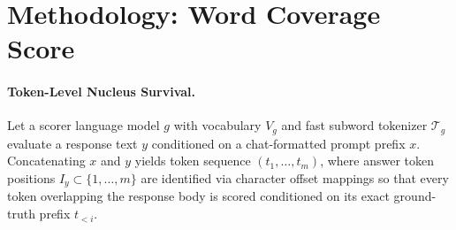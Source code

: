 \documentclass[11pt]{article}
\begin{document}
\section{Methodology: Word Coverage Score}

\paragraph{Token-Level Nucleus Survival.}
Let a scorer language model $g$ with vocabulary $V_g$ and fast subword tokenizer $\mathcal{T}_g$ evaluate a response text $y$ conditioned on a chat-formatted prompt prefix $x$. Concatenating $x$ and $y$ yields token sequence $(t_1, \dots, t_m)$, where answer token positions $I_y \subset \{1, \dots, m\}$ are identified via character offset mappings so that every token overlapping the response body is scored conditioned on its exact ground-truth prefix $t_{<i}$.
\end{document}
